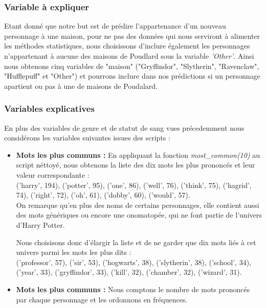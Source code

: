 \documentclass[11pt]{article}
\begin{document}
\subsubsection{Variable à expliquer}

Etant donné que notre but est de prédire l'appartenance d'un nouveau personnage à une maison, pour ne pas des données qui nous serviront à alimenter les méthodes statistiques, nous choisissons d'inclure également les personnages n'appartenant à aucune des maisons de Poudlard sous la variable \textit{'Other'}. Ainsi nous obtenons cinq variables de "maison" ("Gryffindor", "Slytherin", "Ravenclaw", "Hufflepuff" et "Other") et pourrons inclure dans nos prédictions si un personnage apartient ou pas à une de maisons de Poudalard.\par

\subsubsection{Variables explicatives}

En plus des variables de genre et de statut de sang vues précedemment nous considérons les variables suivantes issues des scripts :

\begin{itemize}
    \renewcommand{\labelitemi}{$\bullet$}
    \item \textbf{Mots les plus communs :} En appliquant la fonction \textit{most\_common(10)} au script néttoyé, nous obtenons la liste des dix mots les plus prononcés et leur valeur correspondante : \\
    ('harry', 194), ('potter', 95), ('one', 86), ('well', 76), ('think', 75), ('hagrid', 74), ('right', 72), ('oh', 61), ('dobby', 60), ('would', 57).\\
    On remarque qu'en plus des noms de certains personnages, elle contient aussi des mots génériques ou encore une onomatopée, qui ne font partie de l'univers d'Harry Potter.\par
    Nous choisisons donc d'élargir la liste et de ne garder que dix mots liés à cet univers parmi les mots les plus dits : \\
    ('professor', 57), ('sir', 53), ('hogwarts', 38), ('slytherin', 38), ('school', 34), ('year', 33), ('gryffindor', 33), ('kill', 32), ('chamber', 32), ('wizard', 31).

    \item \textbf{Mots les plus communs :} Nous comptons le nombre de mots prononcés par chaque personnage et les ordonnons en fréquences.

\end{itemize}
\end{document}
